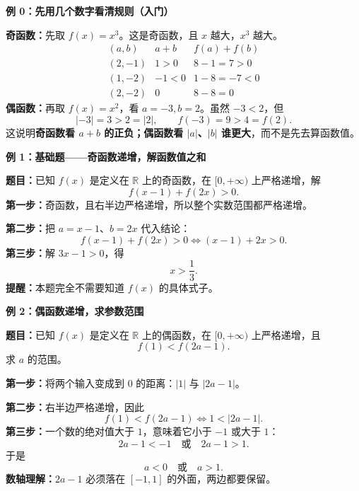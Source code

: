 \clearpage
\begin{examplebox}
\textbf{\textcolor{CExample}{例 0：先用几个数字看清规则（入门）}}



\textbf{奇函数：}先取 $f(x)=x^3$。这是奇函数，且 $x$ 越大，$x^3$ 越大。
\[
\begin{array}{c|c|c}
(a,b)&a+b&f(a)+f(b)\\\hline
(2,-1)&1>0&8-1=7>0\\
(1,-2)&-1<0&1-8=-7<0\\
(2,-2)&0&8-8=0
\end{array}
\]
\textbf{偶函数：}再取 $f(x)=x^2$，看 $a=-3,b=2$。虽然 $-3<2$，但
\[
|-3|=3>2=|2|,\qquad f(-3)=9>4=f(2).
\]
这说明\textbf{奇函数看 $a+b$ 的正负；偶函数看 $|a|$、$|b|$ 谁更大}，而不是先去算函数值。

\medskip

\end{examplebox}
\clearpage
\begin{examplebox}
\textbf{\textcolor{CExample}{例 1：基础题——奇函数递增，解函数值之和}}



\textbf{题目：}已知 $f(x)$ 是定义在 $\mathbb R$ 上的奇函数，在 $[0,+\infty)$ 上严格递增，解
\[
 f(x-1)+f(2x)>0.
\]
\textbf{第一步：}奇函数，且右半边严格递增，所以整个实数范围都严格递增。

\textbf{第二步：}把 $a=x-1$、$b=2x$ 代入结论：
\[
 f(x-1)+f(2x)>0\iff (x-1)+2x>0.
\]
\textbf{第三步：}解 $3x-1>0$，得
\[
\boxed{x>\frac13}.
\]
\textbf{提醒：}本题完全不需要知道 $f(x)$ 的具体式子。

\medskip

\end{examplebox}
\clearpage
\begin{examplebox}
\textbf{\textcolor{CExample}{例 2：偶函数递增，求参数范围}}



\textbf{题目：}已知 $f(x)$ 是定义在 $\mathbb R$ 上的偶函数，在 $[0,+\infty)$ 上严格递增，且
\[
 f(1)<f(2a-1).
\]
求 $a$ 的范围。

\textbf{第一步：}将两个输入变成到 $0$ 的距离：$|1|$ 与 $|2a-1|$。

\textbf{第二步：}右半边严格递增，因此
\[
 f(1)<f(2a-1)\iff 1<|2a-1|.
\]
\textbf{第三步：}一个数的绝对值大于 $1$，意味着它小于 $-1$ 或大于 $1$：
\[
 2a-1<-1\quad\text{或}\quad 2a-1>1.
\]
于是
\[
\boxed{a<0\quad\text{或}\quad a>1}.
\]
\textbf{数轴理解：}$2a-1$ 必须落在 $[-1,1]$ 的外面，两边都要保留。

\medskip

\end{examplebox}

